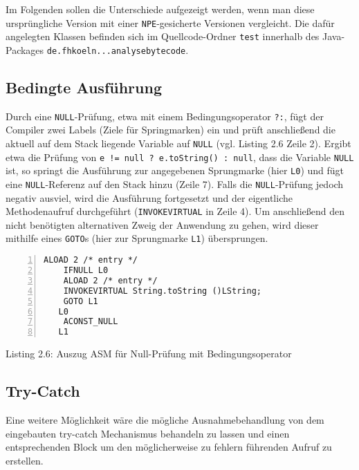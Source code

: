 \vspace{0.3cm}

Im Folgenden sollen die Unterschiede aufgezeigt werden, wenn man diese ursprüngliche
Version mit einer \texttt{NPE}-gesicherte Versionen vergleicht. Die dafür angelegten Klassen
befinden sich im Quellcode-Ordner \texttt{test} innerhalb des Java-Packages \texttt{de.fhkoeln...analysebytecode}.

\vspace{0.3cm}


\subsection{Bedingte Ausführung}

Durch eine \texttt{NULL}-Prüfung, etwa mit einem Bedingungsoperator \texttt{?:},
fügt der Compiler zwei Labels (Ziele für Springmarken) ein und prüft
anschließend die aktuell auf dem Stack liegende Variable auf \texttt{NULL}
(vgl. Listing 2.6 Zeile 2). Ergibt etwa die Prüfung von
\texttt{e != null ? e.toString() : null}, dass die Variable \texttt{NULL} ist,
so springt die Ausführung zur angegebenen Sprungmarke (hier \texttt{L0})
und fügt eine \texttt{NULL}-Referenz auf den Stack hinzu (Zeile 7).
Falls die \texttt{NULL}-Prüfung jedoch negativ ausviel, wird die Ausführung fortgesetzt
und der eigentliche Methodenaufruf durchgeführt (\texttt{INVOKEVIRTUAL} in Zeile 4).
Um anschließend den nicht benötigten alternativen Zweig der Anwendung zu gehen,
wird dieser mithilfe eines \texttt{GOTO}s (hier zur Sprungmarke \texttt{L1}) übersprungen.

\begin{lstlisting}[basicstyle=\ttfamily,numbers=left,numberstyle=\footnotesize\ttfamily,backgroundcolor=\color{source}]
    ALOAD 2 /* entry */
    IFNULL L0
    ALOAD 2 /* entry */
    INVOKEVIRTUAL String.toString ()LString;
    GOTO L1
   L0
    ACONST_NULL
   L1
\end{lstlisting}
\centerline{Listing 2.6: Auszug ASM für Null-Prüfung mit Bedingungsoperator}

\vspace{0.3cm}


\subsection{Try-Catch}

Eine weitere Möglichkeit wäre die mögliche Ausnahmebehandlung von dem eingebauten
try-catch Mechanismus behandeln zu lassen und einen entsprechenden Block um
den möglicherweise zu fehlern führenden Aufruf zu erstellen.

